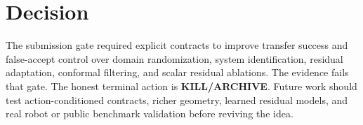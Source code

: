 \documentclass{article}
\begin{document}
\section{Decision}
The submission gate required explicit contracts to improve transfer success and false-accept control over domain randomization, system identification, residual adaptation, conformal filtering, and scalar residual ablations.
The evidence fails that gate.
The honest terminal action is \textbf{KILL/ARCHIVE}.
Future work should test action-conditioned contracts, richer geometry, learned residual models, and real robot or public benchmark validation before reviving the idea.



\end{document}
